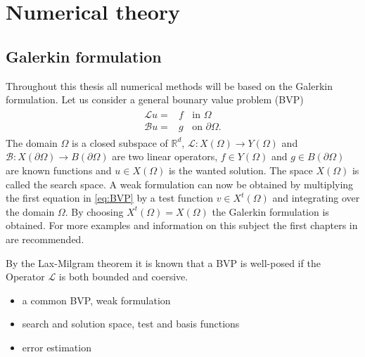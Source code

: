
\chapter{Numerical theory} %

\label{theory} %



\section{Galerkin formulation}
Throughout this thesis all numerical methods will be based on the Galerkin formulation. Let us consider a general bounary value problem (BVP)
\begin{align}
	\begin{split}
	\mathcal{L}u =& f \;\; \text{ in } \Omega\\
	\mathcal{B}u =& g \;\; \text{ on } \partial\Omega.
	\end{split}
	\label{eq:BVP}
\end{align}
The domain $\Omega$ is a closed subspace of $\mathbb{R}^d$, $\mathcal{L}: X(\Omega)\rightarrow Y(\Omega)$ and $\mathcal{B}: X(\partial\Omega)\rightarrow B(\partial\Omega)$ are two linear operators,
$f\in Y(\Omega)$ and $g\in B(\partial\Omega)$ are known functions and $u \in X(\Omega)$ is the wanted solution. 
The space $X(\Omega)$ is called the search space. A weak formulation can now be obtained by multiplying the first equation in \ref{eq:BVP} 
by a test function $v \in X^t(\Omega)$ and integrating over the domain $\Omega$. By choosing $X^t(\Omega) = X(\Omega)$ the Galerkin formulation is obtained.
For more examples and information on this subject the first chapters in \cite{Quarteroni} are recommended. 

By the Lax-Milgram theorem it is known that a BVP is well-posed if the Operator $\mathcal{L}$ is both bounded and coersive.   
\begin{itemize}
\item a common BVP, weak formulation 
\item search and solution space, test and basis functions
\item error estimation
\end{itemize}
